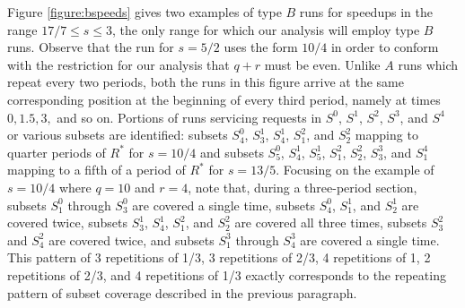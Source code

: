 \documentclass[11pt]{article}
\begin{document}
Figure \ref{figure:bspeeds} gives two examples of type $B$ runs for speedups in the range $17/7 \leq s \leq 3$, the only range for which our analysis will employ type $B$ runs.  Observe that the run for $s = 5/2$ uses the form $10/4$ in order to conform with the restriction for our analysis that $q + r$ must be even.  Unlike $A$ runs which repeat every two periods, both the runs in this figure arrive at the same corresponding position at the beginning of every third period, namely at times $0, 1.5, 3,$ and so on.  Portions of runs servicing requests in $S^0$, $S^1$, $S^2$, $S^3$, and $S^4$ or various subsets are identified: subsets $S^0_4$, $S^1_3$, $S^1_4$, $S^2_1$, and $S^2_2$  mapping to quarter periods of $R^*$ for $s = 10/4$ and subsets $S^0_5$, $S^1_4$, $S^1_5$, $S^2_1$, $S^2_2$, $S^3_3$, and $S^4_1$ mapping to a fifth of a period of $R^*$ for $s = 13/5$.  Focusing on the example of $s = 10/4$ where $q = 10$ and $r = 4$, note that, during a three-period section, subsets $S^0_1$ through $S^0_3$ are covered a single time, subsets $S^0_4$, $S^1_1$, and $S^1_2$ are covered twice, subsets $S^1_3$, $S^1_4$, $S^2_1$, and $S^2_2$ are covered all three times, subsets $S^2_3$ and $S^2_4$ are covered twice, and subsets $S^3_1$ through $S^3_4$ are covered a single time.  This pattern of 3 repetitions of 1/3, 3 repetitions of 2/3, 4 repetitions of 1, 2 repetitions of 2/3, and 4 repetitions of 1/3 exactly corresponds to the repeating pattern of subset coverage described in the previous paragraph.
\end{document}
